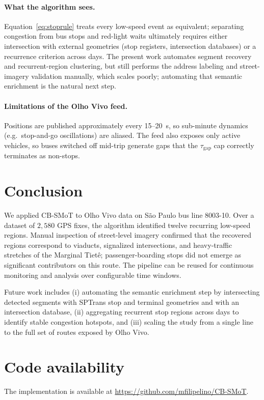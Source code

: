 \documentclass[11pt,a4paper]{article}
\begin{document}
\paragraph{What the algorithm sees.}
Equation~\eqref{eq:stoprule} treats every low-speed event as equivalent;
separating congestion from bus stops and red-light waits ultimately
requires either intersection with external geometries (stop registers,
intersection databases) or a recurrence criterion across days. The
present work automates segment recovery and recurrent-region clustering,
but still performs the address labeling and street-imagery validation
manually, which scales poorly; automating that semantic enrichment is
the natural next step.

\paragraph{Limitations of the Olho Vivo feed.}
Positions are published approximately every 15--20~s, so sub-minute
dynamics (e.g.\ stop-and-go oscillations) are aliased. The feed also
exposes only active vehicles, so buses switched off mid-trip generate
gaps that the $\tau_{\text{gap}}$ cap correctly terminates as
non-stops.

\section{Conclusion}
\label{sec:conclusion}

We applied CB-SMoT to Olho Vivo data on São Paulo bus line 8003-10.
Over a dataset of $2{,}580$ GPS fixes, the algorithm identified twelve
recurring low-speed regions. Manual inspection of street-level imagery
confirmed that the recovered regions correspond to viaducts, signalized
intersections, and heavy-traffic stretches of the Marginal Tietê;
passenger-boarding stops did not emerge as significant contributors on
this route. The pipeline can be reused for continuous monitoring and
analysis over configurable time windows.

Future work includes (i) automating the semantic enrichment step by
intersecting detected segments with SPTrans stop and terminal
geometries and with an intersection database, (ii) aggregating
recurrent stop regions across days to identify stable congestion
hotspots, and (iii) scaling the study from a single line to the full
set of routes exposed by Olho Vivo.

\section*{Code availability}
The implementation is available at
\url{https://github.com/mfilipelino/CB-SMoT}.
\end{document}
